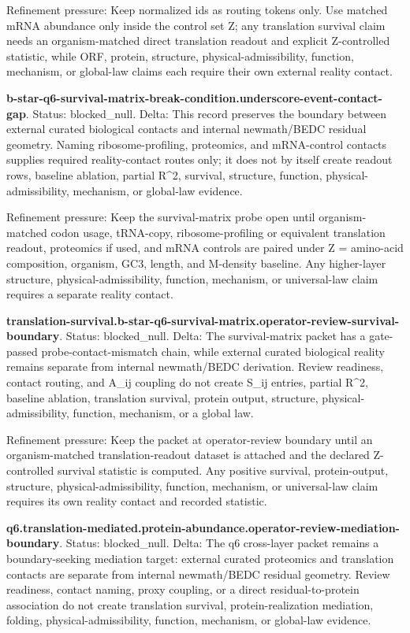 Refinement pressure: Keep normalized ids as routing tokens only. Use matched mRNA abundance only inside the control set Z; any translation survival claim needs an organism-matched direct translation readout and explicit Z-controlled statistic, while ORF, protein, structure, physical-admissibility, function, mechanism, or global-law claims each require their own external reality contact.

\textbf{b-star-q6-survival-matrix-break-condition.underscore-event-contact-gap}. Status: blocked\_null. Delta: This record preserves the boundary between external curated biological contacts and internal newmath/BEDC residual geometry. Naming ribosome-profiling, proteomics, and mRNA-control contacts supplies required reality-contact routes only; it does not by itself create readout rows, baseline ablation, partial R\textasciicircum{}2, survival, structure, function, physical-admissibility, mechanism, or global-law evidence.

Refinement pressure: Keep the survival-matrix probe open until organism-matched codon usage, tRNA-copy, ribosome-profiling or equivalent translation readout, proteomics if used, and mRNA controls are paired under Z = amino-acid composition, organism, GC3, length, and M-density baseline. Any higher-layer structure, physical-admissibility, function, mechanism, or universal-law claim requires a separate reality contact.

\textbf{translation-survival.b-star-q6-survival-matrix.operator-review-survival-boundary}. Status: blocked\_null. Delta: The survival-matrix packet has a gate-passed probe-contact-mismatch chain, while external curated biological reality remains separate from internal newmath/BEDC derivation. Review readiness, contact routing, and A\_ij coupling do not create S\_ij entries, partial R\textasciicircum{}2, baseline ablation, translation survival, protein output, structure, physical-admissibility, function, mechanism, or a global law.

Refinement pressure: Keep the packet at operator-review boundary until an organism-matched translation-readout dataset is attached and the declared Z-controlled survival statistic is computed. Any positive survival, protein-output, structure, physical-admissibility, function, mechanism, or universal-law claim requires its own reality contact and recorded statistic.

\textbf{q6.translation-mediated.protein-abundance.operator-review-mediation-boundary}. Status: blocked\_null. Delta: The q6 cross-layer packet remains a boundary-seeking mediation target: external curated proteomics and translation contacts are separate from internal newmath/BEDC residual geometry. Review readiness, contact naming, proxy coupling, or a direct residual-to-protein association do not create translation survival, protein-realization mediation, folding, physical-admissibility, function, mechanism, or global-law evidence.

